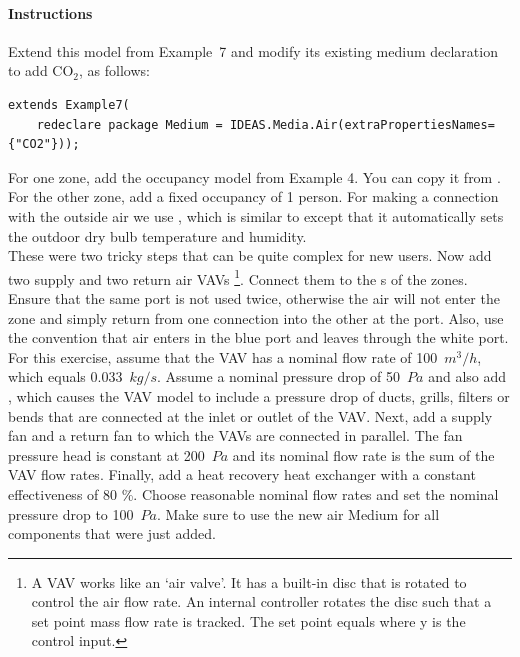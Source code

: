 \documentclass[10pt,a4paper]{article}
\begin{document}
\newpage

\paragraph{Instructions}
Extend this model from Example~7 and modify its existing medium declaration
to add CO$_2$, as follows:
\begin{verbatim}
extends Example7(
    redeclare package Medium = IDEAS.Media.Air(extraPropertiesNames={"CO2"}));
\end{verbatim}
For one zone, add the occupancy model from Example 4. 
You can copy it from .
For the other zone, add a fixed occupancy of 1 person. For making a connection with the outside air we use ,
which is similar to  except that it 
automatically sets the outdoor dry bulb temperature and humidity. \\

These were two tricky steps that can be quite complex for new users. 
Now add two supply and two return air VAVs
\footnote{A VAV works like an `air valve'. It has a built-in disc that is rotated to control the 
air flow rate. An internal controller rotates the disc such that a set point mass flow rate is tracked.
The set point equals  where y is the control input.}.
Connect them to the s of the zones. 
Ensure that the same port is not used twice, otherwise
the air will not enter the zone and simply return from one 
connection into the other at the port.
Also, use the convention that air enters in the blue port and leaves
through the white port.
For this exercise, assume that the VAV has a nominal flow rate of 100~$m^3/h$,
which equals 0.033~$kg/s$.
Assume a nominal pressure drop of 50~$Pa$ and
also add , which causes the VAV
model to include a pressure drop of ducts, grills, filters or bends that are connected
at the inlet or outlet of the VAV. Next, add a supply fan and a return fan to which the VAVs
are connected in parallel. The fan pressure head is constant at 200~$Pa$
and its nominal flow rate is the sum of the VAV flow rates.
Finally, add a heat recovery heat exchanger with a constant effectiveness of 80 \%.
Choose reasonable nominal flow rates and set the nominal pressure drop to 100~$Pa$.
Make sure to use the new air Medium for all components that were just added.\\
\end{document}
